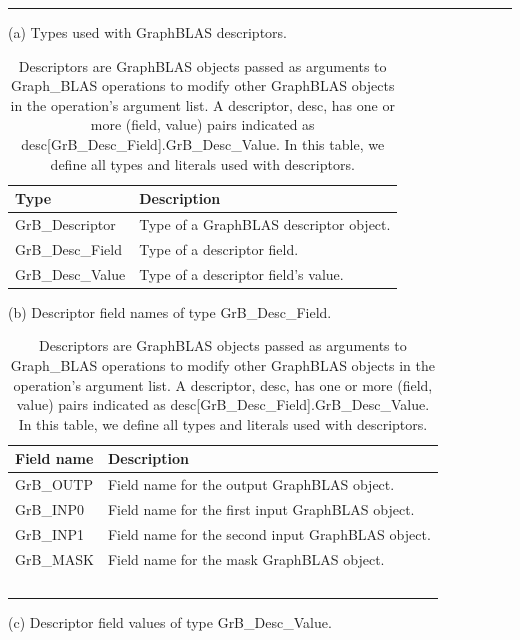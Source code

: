 \begin{table}
\hrule
\begin{center}
\caption{Descriptors are GraphBLAS objects passed as arguments to Graph\_BLAS 
operations to modify other GraphBLAS objects in the operation's argument list.
A descriptor, {\sf desc}, has one or more (field, value) pairs indicated 
as  {\sf desc[GrB\_Desc\_Field].GrB\_Desc\_Value}. In this table, we define all types and literals used
with descriptors.}
\label{Tab:DescTypeLiterals}

\vspace{1\baselineskip}
(a) Types used with GraphBLAS descriptors.
\vspace{1\baselineskip}

\begin{tabular}{l|l}
Type			& Description \\ \hline
{\sf GrB\_Descriptor}     &  Type of a GraphBLAS descriptor object. \\
{\sf GrB\_Desc\_Field}              &  Type of a descriptor field. \\
{\sf GrB\_Desc\_Value}             &  Type of a descriptor field's value. \\
\end{tabular}

\vspace{1\baselineskip}
(b) Descriptor field names of type {\sf GrB\_Desc\_Field}.
\vspace{1\baselineskip}

\begin{tabular}{l|l}
Field name          & Description \\ \hline
{\sf GrB\_OUTP} &  Field name for the output GraphBLAS object. \\
{\sf GrB\_INP0}   &  Field name for the first input GraphBLAS object. \\
{\sf GrB\_INP1}   &  Field name for the second input  GraphBLAS object. \\
{\sf GrB\_MASK} &  Field name for the mask GraphBLAS object. \\\
\end{tabular}

\vspace{1\baselineskip}
(c) Descriptor field values of type {\sf GrB\_Desc\_Value}.
\vspace{1\baselineskip}


\end{center}
\end{table}
